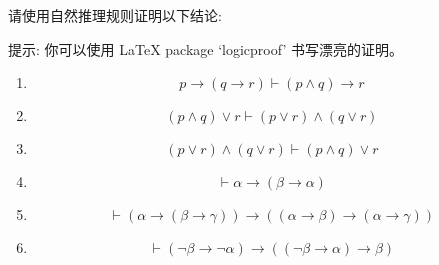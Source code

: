 \documentclass[a4paper, justified]{tufte-handout}
\begin{document}
\newpage
\begin{problem}[命题逻辑的自然推理系统]
  请使用自然推理规则证明以下结论:

  {提示: 你可以使用 \LaTeX{} package `logicproof' 书写漂亮的证明。}
  \begin{enumerate}[(1)]
    \item
      \[
        p  \to (q \to r) \vdash (p \land q) \to r
      \]
    \item
      \[
        (p \land q) \lor r \vdash (p \lor r) \land (q \lor r)
      \]
    \item
      \[
        (p \lor r) \land (q \lor r) \vdash (p \land q) \lor r
      \]
    \item
      \[
        \vdash \alpha \to (\beta \to \alpha)
      \]
    \item
      \[
        \vdash (\alpha \to (\beta \to \gamma)) \to ((\alpha \to \beta) \to (\alpha \to \gamma))
      \]
    \item
      \[
        \vdash (\lnot \beta \to \lnot \alpha) \to ((\lnot \beta \to \alpha) \to \beta)
      \]
  \end{enumerate}
\end{problem}
\end{document}
